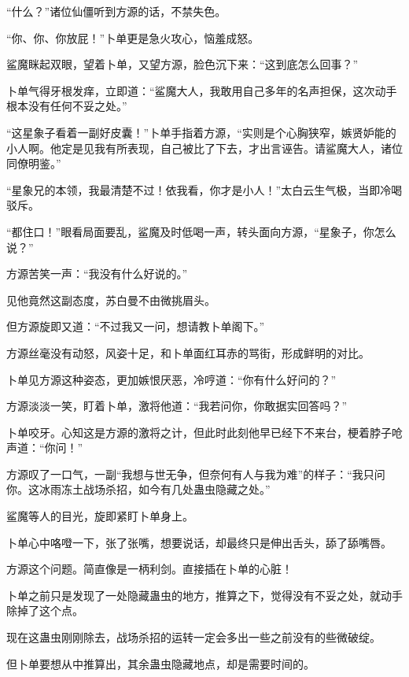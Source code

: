 
\begin{this_body}



“什么？”诸位仙僵听到方源的话，不禁失色。

“你、你、你放屁！”卜单更是急火攻心，恼羞成怒。

鲨魔眯起双眼，望着卜单，又望方源，脸色沉下来：“这到底怎么回事？”

卜单气得牙根发痒，立即道：“鲨魔大人，我敢用自己多年的名声担保，这次动手根本没有任何不妥之处。”

“这星象子看着一副好皮囊！”卜单手指着方源，“实则是个心胸狭窄，嫉贤妒能的小人啊。他定是见我有所表现，自己被比了下去，才出言诬告。请鲨魔大人，诸位同僚明鉴。”

“星象兄的本领，我最清楚不过！依我看，你才是小人！”太白云生气极，当即冷喝驳斥。

“都住口！”眼看局面要乱，鲨魔及时低喝一声，转头面向方源，“星象子，你怎么说？”

方源苦笑一声：“我没有什么好说的。”

见他竟然这副态度，苏白曼不由微挑眉头。

但方源旋即又道：“不过我又一问，想请教卜单阁下。”

方源丝毫没有动怒，风姿十足，和卜单面红耳赤的骂街，形成鲜明的对比。

卜单见方源这种姿态，更加嫉恨厌恶，冷哼道：“你有什么好问的？”

方源淡淡一笑，盯着卜单，激将他道：“我若问你，你敢据实回答吗？”

卜单咬牙。心知这是方源的激将之计，但此时此刻他早已经下不来台，梗着脖子呛声道：“你问！”

方源叹了一口气，一副“我想与世无争，但奈何有人与我为难”的样子：“我只问你。这冰雨冻土战场杀招，如今有几处蛊虫隐藏之处。”

鲨魔等人的目光，旋即紧盯卜单身上。

卜单心中咯噔一下，张了张嘴，想要说话，却最终只是伸出舌头，舔了舔嘴唇。

方源这个问题。简直像是一柄利剑。直接插在卜单的心脏！

卜单之前只是发现了一处隐藏蛊虫的地方，推算之下，觉得没有不妥之处，就动手除掉了这个点。

现在这蛊虫刚刚除去，战场杀招的运转一定会多出一些之前没有的些微破绽。

但卜单要想从中推算出，其余蛊虫隐藏地点，却是需要时间的。


\end{this_body}
